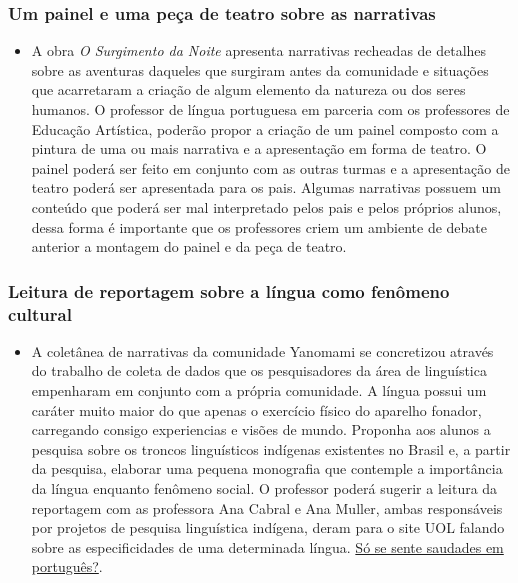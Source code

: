 \documentclass[12pt]{extarticle}
\begin{document}
\subsubsection{Um painel e uma peça de teatro sobre as narrativas}


\begin{itemize}
\item
  A obra \emph{O Surgimento da Noite} apresenta narrativas recheadas de
  detalhes sobre as aventuras daqueles que surgiram antes da comunidade
  e situações que acarretaram a criação de algum elemento da natureza ou
  dos seres humanos. O professor de língua portuguesa em parceria com os
  professores de Educação Artística, poderão propor a criação de um
  painel composto com a pintura de uma ou mais narrativa e a
  apresentação em forma de teatro. O painel poderá ser feito em conjunto
  com as outras turmas e a apresentação de teatro poderá ser apresentada
  para os pais. Algumas narrativas possuem um conteúdo que poderá ser
  mal interpretado pelos pais e pelos próprios alunos, dessa forma é
  importante que os professores criem um ambiente de debate anterior a
  montagem do painel e da peça de teatro.
\end{itemize}

\subsubsection{Leitura de reportagem sobre a língua como fenômeno cultural}

\begin{itemize}
\item
  A coletânea de narrativas da comunidade Yanomami se concretizou
  através do trabalho de coleta de dados que os pesquisadores da área de
  linguística empenharam em conjunto com a própria comunidade. A língua
  possui um caráter muito maior do que apenas o exercício físico do
  aparelho fonador, carregando consigo experiencias e visões de mundo.
  Proponha aos alunos a pesquisa sobre os troncos linguísticos indígenas
  existentes no Brasil e, a partir da pesquisa, elaborar uma pequena
  monografia que contemple a importância da língua enquanto fenômeno
  social. O professor poderá sugerir a leitura da reportagem com as
  professora Ana Cabral e Ana Muller, ambas responsáveis por projetos de
  pesquisa linguística indígena, deram para o site UOL falando sobre as
  especificidades de uma determinada língua.
  \href{https://tab.uol.com.br/noticias/redacao/2020/10/11/saudade-ansiedade-aconchego-como-a-lingua-influencia-cultura-e-sensacoes.htm}%
  {Só se sente saudades em português?}.
\end{itemize}
\end{document}
